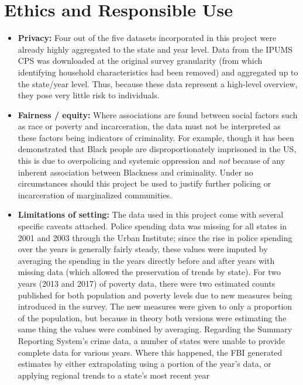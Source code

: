 \documentclass[
  letterpaper,
  DIV=11,
  numbers=noendperiod]{scrartcl}
\begin{document}
\section{Ethics and Responsible Use}\label{ethics-and-responsible-use}

\begin{itemize}
\item
  \textbf{Privacy:} Four out of the five datasets incorporated in this
  project were already highly aggregated to the state and year level.
  Data from the IPUMS CPS was downloaded at the original survey
  granularity (from which identifying household characteristics had been
  removed) and aggregated up to the state/year level. Thus, because
  these data represent a high-level overview, they pose very little risk
  to individuals.
\item
  \textbf{Fairness / equity:} Where associations are found between
  social factors such as race or poverty and incarceration, the data
  must not be interpreted as these factors being indicators of
  criminality. For example, though it has been demonstrated that Black
  people are disproportionately imprisoned in the US, this is due to
  overpolicing and systemic oppression and \emph{not} because of any
  inherent association between Blackness and criminality. Under no
  circumstances should this project be used to justify further policing
  or incarceration of marginalized communities.
\item
  \textbf{Limitations of setting:} The data used in this project come
  with several specific caveats attached. Police spending data was
  missing for all states in 2001 and 2003 through the Urban Institute;
  since the rise in police spending over the years is generally fairly
  steady, these values were imputed by averaging the spending in the
  years directly before and after years with missing data (which allowed
  the preservation of trends by state). For two years (2013 and 2017) of
  poverty data, there were two estimated counts published for both
  population and poverty levels due to new measures being introduced in
  the survey. The new measures were given to only a proportion of the
  population, but because in theory both versions were estimating the
  same thing the values were combined by averaging. Regarding the
  Summary Reporting System's crime data, a number of states were unable
  to provide complete data for various years. Where this happened, the
  FBI generated estimates by either extrapolating using a portion of the
  year's data, or applying regional trends to a state's most recent year

\end{itemize}
\end{document}
